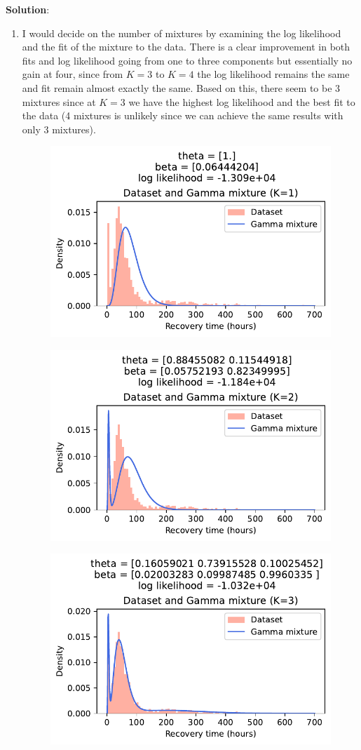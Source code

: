 \documentclass[submit]{../harvardml}
\newenvironment{solution}{
    \vspace{2mm}
    \color{blue}\noindent\textbf{Solution}:
}{}
\begin{document}
\begin{solution}
\begin{enumerate}
    \item I would decide on the number of mixtures by examining the log likelihood and the fit of the mixture to the data. There is a clear improvement in both fits and log likelihood going from one to three components but essentially no gain at four, since from $K = 3$ to $K = 4$ the log likelihood remains the same and fit remain almost exactly the same. Based on this, there seem to be 3 mixtures since at $K = 3$ we have the highest log likelihood and the best fit to the data (4 mixtures is unlikely since we can achieve the same results with only 3 mixtures).
    \begin{figure}[H]
        \centering
        \includegraphics[width=0.8\linewidth]{hw5/img_output/p2_3_1mixtures.pdf}
    \end{figure}
    \begin{figure}[H]
        \centering
        \includegraphics[width=0.8\linewidth]{hw5/img_output/p2_3_2mixtures.pdf}
    \end{figure}
    \begin{figure}[H]
        \centering
        \includegraphics[width=0.8\linewidth]{hw5/img_output/p2_3_3mixtures.pdf}

\end{figure}
\end{enumerate}
\end{solution}
\end{document}
